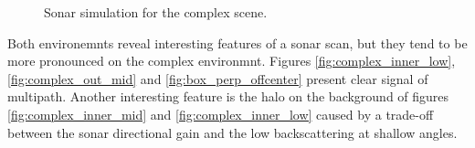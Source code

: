 \begin{figure}[ht]
    \hfill {}%
    \caption{Sonar simulation for the complex scene.}%
    \label{fig:jirau_simul}%
\end{figure}

Both environemnts reveal interesting features of a sonar scan, but they tend to
be more pronounced on the complex environmnt. Figures
\ref{fig:complex_inner_low}, \ref{fig:complex_out_mid} and
\ref{fig:box_perp_offcenter} present clear signal of multipath. Another
interesting feature is the halo on the background of figures
\ref{fig:complex_inner_mid} and \ref{fig:complex_inner_low} caused by a
trade-off between the sonar directional gain and the low backscattering at
shallow angles.
